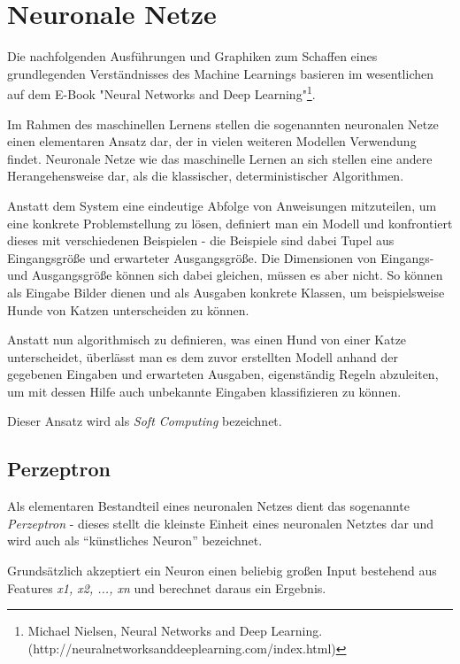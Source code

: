 
\section{Neuronale Netze}



Die nachfolgenden Ausführungen und Graphiken zum Schaffen eines grundlegenden Verständnisses des Machine Learnings
basieren im wesentlichen auf dem E-Book "Neural Networks and Deep Learning"\footnote{Michael Nielsen, Neural Networks and Deep Learning.\newline
(http://neuralnetworksanddeeplearning.com/index.html)}.

Im Rahmen des maschinellen Lernens stellen die sogenannten neuronalen Netze einen elementaren Ansatz dar,
der in vielen weiteren Modellen Verwendung findet. Neuronale Netze wie das maschinelle Lernen an sich
stellen eine andere Herangehensweise dar, als die klassischer, deterministischer Algorithmen.

Anstatt dem System eine eindeutige Abfolge von Anweisungen mitzuteilen, um eine konkrete Problemstellung
zu lösen, definiert man ein Modell und konfrontiert dieses mit verschiedenen Beispielen - die Beispiele
sind dabei Tupel aus Eingangsgröße und erwarteter Ausgangsgröße. Die Dimensionen von Eingangs- und Ausgangsgröße
können sich dabei gleichen, müssen es aber nicht. So können als Eingabe Bilder dienen und als
Ausgaben konkrete Klassen, um beispielsweise Hunde von Katzen unterscheiden zu können.

Anstatt nun algorithmisch zu definieren, was einen Hund von einer Katze unterscheidet, überlässt man es dem zuvor
erstellten Modell anhand der gegebenen Eingaben und erwarteten Ausgaben, eigenständig Regeln abzuleiten, um mit
dessen Hilfe auch unbekannte Eingaben klassifizieren zu können.

Dieser Ansatz wird als \textit{Soft Computing} bezeichnet.

\subsection{Perzeptron}

Als elementaren Bestandteil eines neuronalen Netzes dient das sogenannte \textit{Perzeptron} - dieses stellt
die kleinste Einheit eines neuronalen Netztes dar und wird auch als ``künstliches Neuron'' bezeichnet.

Grundsätzlich akzeptiert ein Neuron einen beliebig großen Input bestehend aus Features \textit{x1, x2, ..., xn} und
berechnet daraus ein Ergebnis.

